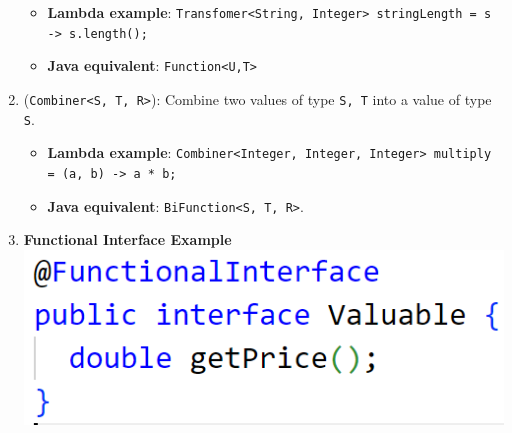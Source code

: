 \documentclass[10pt, landscape]{article}
\begin{document}
\begin{multicols}{4}
\begin{enumerate}
\begin{itemize}
        \item \textbf{Lambda example}: \texttt{Transfomer<String, Integer> stringLength = s -> s.length();}
        \item \textbf{Java equivalent}: \texttt{Function<U,T>}
    \end{itemize}
    \item (\texttt{Combiner<S, T, R>}): Combine two values of type \texttt{S, T} into a value of type \texttt{S}.
    \begin{itemize}
        \item \textbf{Lambda example}: \texttt{Combiner<Integer, Integer, Integer> multiply = (a, b) -> a * b;}
        \item \textbf{Java equivalent}: \texttt{BiFunction<S, T, R>}.
    \end{itemize}
    \item \textbf{Functional Interface Example} \\
    \includegraphics[width=0.8\linewidth]{PE/PE2/images/7.png}
\end{enumerate}


\end{multicols}
\end{document}
